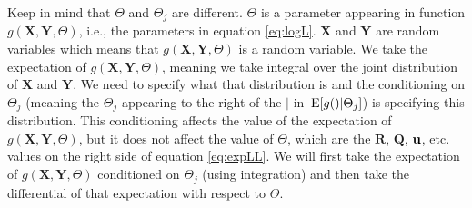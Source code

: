 \documentclass[]{article}
\def\QQ{\mbox{$\mathbf Q$}}	 \def\qq{\mbox{$\mathbf q$}}
\def\RR{\mbox{$\mathbf R$}}	 \def\rr{\mbox{$\mathbf r$}}
\def\XX{\mbox{$\pmb{X}$}}	\def\xx{\mbox{$\pmb{x}$}}
\def\YY{\mbox{$\pmb{Y}$}}	\def\yy{\mbox{$\pmb{y}$}}
\def\E{\,\textup{\textrm{E}}}
\begin{document}
Keep in mind that $\Theta$ and $\Theta_j$ are different.  $\Theta$ is a parameter appearing in function $g(\XX,\YY,\Theta)$, i.e., the parameters in equation \ref{eq:logL}.  $\XX$ and $\YY$ are random variables which means that $g(\XX,\YY,\Theta)$ is a random variable.  We take the expectation of $g(\XX,\YY,\Theta)$, meaning we take integral over the joint distribution of $\XX$ and $\YY$.  We need to specify what that distribution is and the conditioning on $\Theta_j$ (meaning the $\Theta_j$ appearing to the right of the $|$ in $\E[g()|\Theta_j]$) is specifying this distribution. This conditioning affects the value of the expectation of $g(\XX,\YY,\Theta)$, but it does not affect the value of $\Theta$, which are the $\RR$, $\QQ$, $\mbox{$\mathbf u$}$, etc. values on the right side of equation \ref{eq:expLL}.  We will first take the expectation of $g(\XX,\YY,\Theta)$ conditioned on $\Theta_j$ (using integration) and then take the differential of that expectation with respect to $\Theta$.
\end{document}
